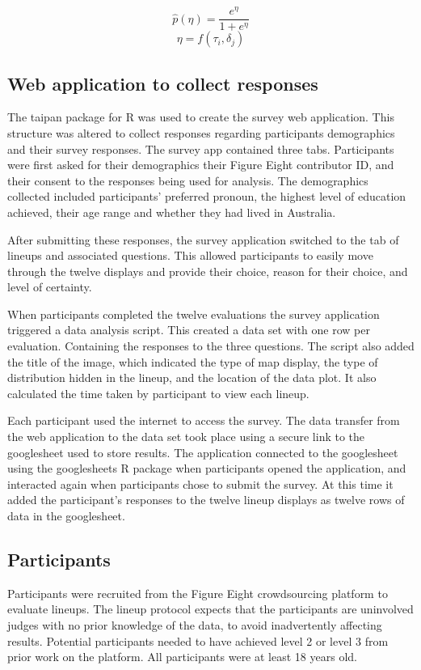 \documentclass[12pt]{article}
\begin{document}
\[\widehat{p}(\eta) = \frac{e^{\eta}}{1 + e^{\eta}}\]
\label{eq:transform} \[\eta = f(\tau_i,\delta_j)\]

\subsection{Web application to collect responses}
\label{sec:watcr}

The taipan \citep{taipan} package for R was used to create the survey
web application. This structure was altered to collect responses
regarding participants demographics and their survey responses. The
survey app contained three tabs. Participants were first asked for their
demographics their Figure Eight contributor ID, and their consent to the
responses being used for analysis. The demographics collected included
participants' preferred pronoun, the highest level of education
achieved, their age range and whether they had lived in Australia.

After submitting these responses, the survey application switched to the
tab of lineups and associated questions. This allowed participants to
easily move through the twelve displays and provide their choice, reason
for their choice, and level of certainty.

When participants completed the twelve evaluations the survey
application triggered a data analysis script. This created a data set
with one row per evaluation. Containing the responses to the three
questions. The script also added the title of the image, which indicated
the type of map display, the type of distribution hidden in the lineup,
and the location of the data plot. It also calculated the time taken by
participant to view each lineup.

Each participant used the internet to access the survey. The data
transfer from the web application to the data set took place using a
secure link to the googlesheet used to store results. The application
connected to the googlesheet using the googlesheets \citep{sheets} R
package when participants opened the application, and interacted again
when participants chose to submit the survey. At this time it added the
participant's responses to the twelve lineup displays as twelve rows of
data in the googlesheet.

\subsection{Participants}
\label{sec:pa}

Participants were recruited from the Figure Eight crowdsourcing platform
\citep{figeight} to evaluate lineups. The lineup protocol expects that
the participants are uninvolved judges with no prior knowledge of the
data, to avoid inadvertently affecting results. Potential participants
needed to have achieved level 2 or level 3 from prior work on the
platform. All participants were at least 18 years old.
\end{document}
